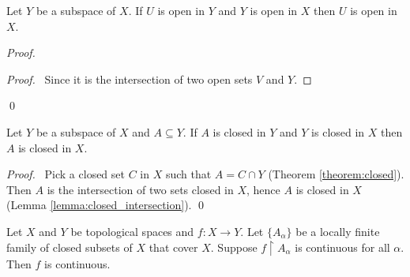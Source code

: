\begin{lemma}
    \label{lemma:subspace_open}
    Let $Y$ be a subspace of $X$. If $U$ is open in $Y$ and $Y$ is open in $X$ then $U$ is open in $X$.
\end{lemma}

\begin{proof}
    \pf
    \begin{proof}
        \pf\ Since it is the intersection of two open sets $V$ and $Y$.
    \end{proof}
    \qed
\end{proof}

\begin{theorem}
    \label{theorem:closed_subspace}
    Let $Y$ be a subspace of $X$ and $A \subseteq Y$. If $A$ is closed in $Y$ and $Y$ is closed in $X$
    then $A$ is closed in $X$.
\end{theorem}

\begin{proof}
    \pf\ Pick a closed set $C$ in $X$ such that $A = C \cap Y$ (Theorem \ref{theorem:closed}). Then
    $A$ is the intersection of two sets closed in $X$, hence $A$ is closed in $X$ (Lemma \ref{lemma:closed_intersection}). \qed
\end{proof}

\begin{theorem}
    Let $X$ and $Y$ be topological spaces and $f : X \rightarrow Y$. Let $\{ A_\alpha \}$ be a locally finite family of closed subsets of $X$ that cover $X$. Suppose $f \restriction A_\alpha$
    is continuous for all $\alpha$. Then $f$ is continuous.
\end{theorem}

